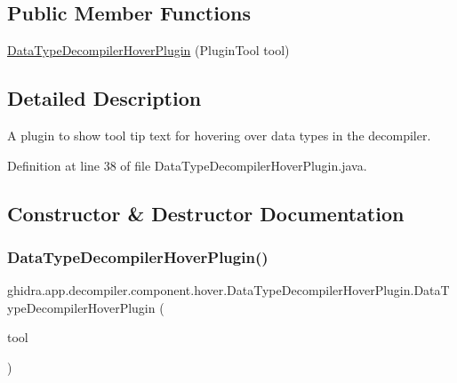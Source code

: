 \subsection*{Public Member Functions}
\begin{DoxyCompactItemize}
\item 
\mbox{\hyperlink{classghidra_1_1app_1_1decompiler_1_1component_1_1hover_1_1_data_type_decompiler_hover_plugin_abb4c7738e76938cc43afc2d84dc51edb}{Data\+Type\+Decompiler\+Hover\+Plugin}} (Plugin\+Tool tool)
\end{DoxyCompactItemize}


\subsection{Detailed Description}
A plugin to show tool tip text for hovering over data types in the decompiler. 

Definition at line 38 of file Data\+Type\+Decompiler\+Hover\+Plugin.\+java.



\subsection{Constructor \& Destructor Documentation}
\mbox{\label{classghidra_1_1app_1_1decompiler_1_1component_1_1hover_1_1_data_type_decompiler_hover_plugin_abb4c7738e76938cc43afc2d84dc51edb}} 
\subsubsection{\texorpdfstring{DataTypeDecompilerHoverPlugin()}{DataTypeDecompilerHoverPlugin()}}
{\footnotesize\ttfamily ghidra.\+app.\+decompiler.\+component.\+hover.\+Data\+Type\+Decompiler\+Hover\+Plugin.\+Data\+Type\+Decompiler\+Hover\+Plugin (\begin{DoxyParamCaption}\item[{Plugin\+Tool}]{tool }\end{DoxyParamCaption})\hspace{0.3cm}{\ttfamily [inline]}}



